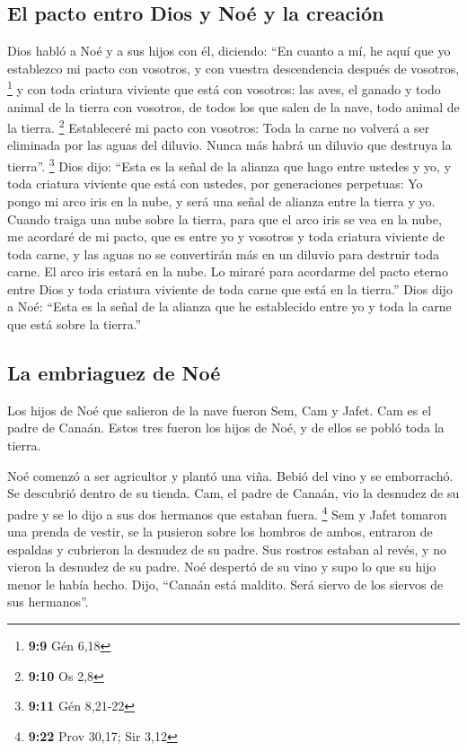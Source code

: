 \hypertarget{el-pacto-entro-dios-y-nouxe9-y-la-creaciuxf3n}{%
\subsection{El pacto entro Dios y Noé y la
creación}\label{el-pacto-entro-dios-y-nouxe9-y-la-creaciuxf3n}}

 Dios habló a Noé y a sus hijos con él, diciendo:
 ``En cuanto a mí, he aquí que yo establezco mi pacto con
vosotros, y con vuestra descendencia después de vosotros, \footnote{\textbf{9:9}
  Gén 6,18}  y con toda criatura viviente que está con
vosotros: las aves, el ganado y todo animal de la tierra con vosotros,
de todos los que salen de la nave, todo animal de la tierra. \footnote{\textbf{9:10}
  Os 2,8}  Estableceré mi pacto con vosotros: Toda la
carne no volverá a ser eliminada por las aguas del diluvio. Nunca más
habrá un diluvio que destruya la tierra''. \footnote{\textbf{9:11} Gén
  8,21-22}  Dios dijo: ``Esta es la señal de la alianza
que hago entre ustedes y yo, y toda criatura viviente que está con
ustedes, por generaciones perpetuas:  Yo pongo mi arco
iris en la nube, y será una señal de alianza entre la tierra y yo.
 Cuando traiga una nube sobre la tierra, para que el arco
iris se vea en la nube,  me acordaré de mi pacto, que es
entre yo y vosotros y toda criatura viviente de toda carne, y las aguas
no se convertirán más en un diluvio para destruir toda carne.
 El arco iris estará en la nube. Lo miraré para acordarme
del pacto eterno entre Dios y toda criatura viviente de toda carne que
está en la tierra.''  Dios dijo a Noé: ``Esta es la señal
de la alianza que he establecido entre yo y toda la carne que está sobre
la tierra.''

\hypertarget{la-embriaguez-de-nouxe9}{%
\subsection{La embriaguez de Noé}\label{la-embriaguez-de-nouxe9}}

 Los hijos de Noé que salieron de la nave fueron Sem, Cam
y Jafet. Cam es el padre de Canaán.  Estos tres fueron
los hijos de Noé, y de ellos se pobló toda la tierra.

 Noé comenzó a ser agricultor y plantó una viña.
 Bebió del vino y se emborrachó. Se descubrió dentro de
su tienda.  Cam, el padre de Canaán, vio la desnudez de
su padre y se lo dijo a sus dos hermanos que estaban fuera. \footnote{\textbf{9:22}
  Prov 30,17; Sir 3,12}  Sem y Jafet tomaron una prenda
de vestir, se la pusieron sobre los hombros de ambos, entraron de
espaldas y cubrieron la desnudez de su padre. Sus rostros estaban al
revés, y no vieron la desnudez de su padre.  Noé despertó
de su vino y supo lo que su hijo menor le había hecho. 
Dijo, ``Canaán está maldito. Será siervo de los siervos de sus
hermanos''.

